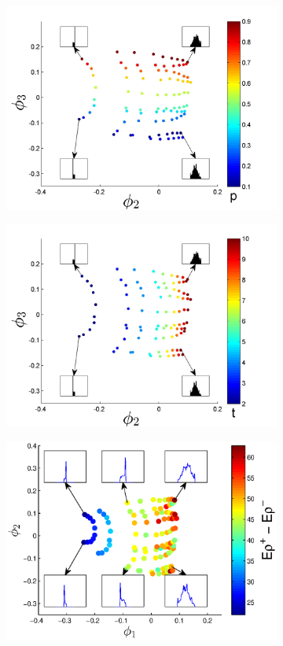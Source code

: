\documentclass[preprint]{elsarticle}
\begin{document}
\begin{figure}[t!]
\begin{subfigure}{\figwidth}
\includegraphics[width=\textwidth]{EMD_withhist_p_400}
\caption{}
\label{subfig:large_lambda_p}
\end{subfigure}
\begin{subfigure}{\figwidth}
\includegraphics[width=\textwidth]{EMD_withhist_t_400}
\caption{}
\label{subfig:large_lambda_t}
\end{subfigure}
\begin{subfigure}{\figwidth}
\includegraphics[width=\textwidth]{EMD_withhist_rho_400}

\end{subfigure}
\end{figure}
\end{document}
